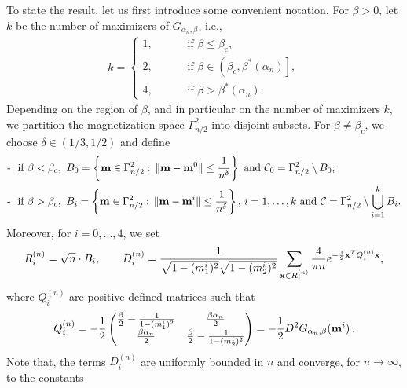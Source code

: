 \documentclass[11pt,oneside]{amsart}
\numberwithin{equation}{section}  %
\theoremstyle{plain}
\theoremstyle{remark}
\def \bm {{\bf m}}
\begin{document}
To state the result, let us first introduce some convenient notation.
For $\beta>0$, let $k$ be the number 
of maximizers of $G_{\alpha_n,\beta}$, i.e., 
\begin{align*}
    k=\begin{cases}
            1, \qquad & \text{ if } \beta \le \beta_c, \\
        2, \qquad & \text{ if } \beta  \in \left (\beta_c,\beta^*(\alpha_n)\right ], \\
        4, \qquad & \text{ if } \beta>\beta^*(\alpha_n).
    \end{cases}
\end{align*}
Depending on the region of $\beta$, and in particular on the number of maximizers $k$, we partition the magnetization space $\Gamma_{n/2}^2$ into disjoint subsets. For $\beta\neq \beta_c$, we choose $\delta \in (1/3, 1/2)$ and define
\begin{equation} \label{def-intorni}
\begin{split}
\mbox{-\,\, if } \beta< \beta_c, \,\,\,   &B_{0}= \left \{ \bm \in \Gamma_{n/2}^2: \, \|\bm-\bm^0\| \leq \frac{1}{n^\delta} \right \} \,\, \text{and}
    \,\, \mathcal{C}_0=\Gamma_{n/2}^2 \setminus B_0;\\
\mbox{-\,\, if } \beta> \beta_c, \,\,\,    & B_{i}= \left \{ \bm \in \Gamma_{n/2}^2: \, \|\bm-\bm^i\| \leq \frac{1}{n^\delta} \right \},\, i=1,\ldots, k \,\,\text{and}
    \,\, \mathcal{C}=\Gamma_{n/2}^2 \setminus \bigcup_{i=1}^k B_i.  
\end{split}
\end{equation}
Moreover, for $i=0,...,4$, we set
\begin{equation}
\label{def:DN}
R_i^{(n)}=\sqrt{n}\cdot B_i, \qquad 
D_i^{(n)}=\frac{1}{\sqrt{1- (m_1^i)^2} \sqrt{1- (m_2^i )^2}}\sum_{{\bf x} \in R_i^{(n)}} \frac{4}{\pi n} e^{-\frac{1}{2}{\bf x}^TQ_i^{(n)}{\bf x} },
\end{equation}
where $Q_i^{(n)}$  are positive defined matrices such that %
\begin{align*}
Q_i^{(n)}= -\frac{1}{2} \begin{pmatrix}
        \frac{\beta}{2}-\frac{1}{1-(m^i_1)^2} & \frac{\beta \alpha_n}{2} \\
        \frac{\beta \alpha_n}{2} & \frac{\beta}{2}-\frac{1}{1-(m^i_2)^2}
    \end{pmatrix}
    =-\frac 1 2 D^2G_{\alpha_n,\beta}(\bm^i)\,.
\end{align*}
Note that, the terms $D_i^{(n)}$ are uniformly bounded in $n$ and converge, for $n\to\infty$, to the constants 
\end{document}
